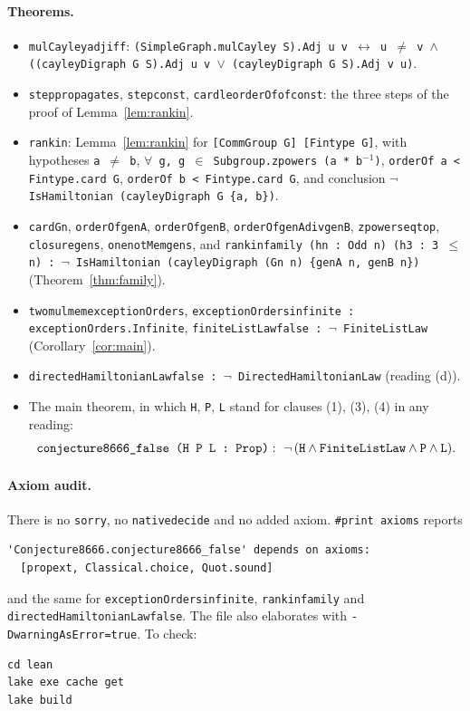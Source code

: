 \documentclass[11pt]{article}
\theoremstyle{definition}
\theoremstyle{remark}
\renewcommand{\_}{\oldus\allowbreak}
\begin{document}
\paragraph{Theorems.}
\begin{itemize}
\item \texttt{mulCayley\_adj\_iff}: \texttt{(SimpleGraph.mulCayley S).Adj u v $\leftrightarrow$ u $\ne$ v
  $\wedge$ ((cayleyDigraph G S).Adj u v $\vee$ (cayleyDigraph G S).Adj v u)}.
\item \texttt{step\_propagates}, \texttt{step\_const}, \texttt{card\_le\_orderOf\_of\_const}: the three
  steps of the proof of Lemma~\ref{lem:rankin}.
\item \texttt{rankin}: Lemma~\ref{lem:rankin} for \texttt{[CommGroup G] [Fintype G]}, with hypotheses
  \texttt{a $\ne$ b}, \texttt{$\forall$ g, g $\in$ Subgroup.zpowers (a * b$^{-1}$)},
  \texttt{orderOf a < Fintype.card G}, \texttt{orderOf b < Fintype.card G}, and conclusion
  \texttt{$\neg$ IsHamiltonian (cayleyDigraph G \{a, b\})}.
\item \texttt{card\_Gn}, \texttt{orderOf\_genA}, \texttt{orderOf\_genB}, \texttt{orderOf\_genA\_div\_genB},
  \texttt{zpowers\_eq\_top}, \texttt{closure\_gens}, \texttt{one\_notMem\_gens}, and
  \texttt{rankin\_family (hn : Odd n) (h3 : 3 $\le$ n) : $\neg$ IsHamiltonian (cayleyDigraph (Gn n)
  \{genA n, genB n\})} (Theorem~\ref{thm:family}).
\item \texttt{two\_mul\_mem\_exceptionOrders}, \texttt{exceptionOrders\_infinite :
  exceptionOrders.Infinite}, \texttt{finiteListLaw\_false : $\neg$ FiniteListLaw}
  (Corollary~\ref{cor:main}).
\item \texttt{directedHamiltonianLaw\_false : $\neg$ DirectedHamiltonianLaw} (reading (d)).
\item The main theorem, in which \texttt{H}, \texttt{P}, \texttt{L} stand for clauses (1), (3), (4) in any
  reading:
\[
  \texttt{conjecture8666\_false (H P L : Prop)} :\ \neg\,(\texttt{H} \wedge \texttt{FiniteListLaw}
  \wedge \texttt{P} \wedge \texttt{L}).
\]
\end{itemize}

\paragraph{Axiom audit.} There is no \texttt{sorry}, no \texttt{native\_decide} and no added axiom.
\texttt{\#print axioms} reports
\begin{verbatim}
'Conjecture8666.conjecture8666_false' depends on axioms:
  [propext, Classical.choice, Quot.sound]
\end{verbatim}
and the same for \texttt{exceptionOrders\_infinite}, \texttt{rankin\_family} and
\texttt{directedHamiltonianLaw\_false}. The file also elaborates with \texttt{-DwarningAsError=true}.
To check:
\begin{verbatim}
cd lean
lake exe cache get
lake build
\end{verbatim}
\end{document}
